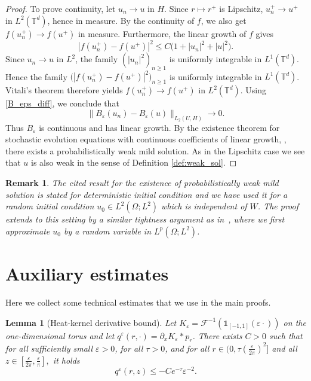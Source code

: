 \documentclass[a4paper,12pt]{article}
\newtheorem{lemma}[theorem]{Lemma}
\newtheorem{remark}[theorem]{Remark}
\begin{document}
\begin{proof}
To prove continuity, let \(u_n\to u\) in \(H\). Since \(r\mapsto r^+\)
is Lipschitz, \(u_n^+\to u^+\) in \(L^2(\mathbb T^d)\), hence in measure. By the
continuity of \(f\), we also get $f(u_n^+)\to f(u^+)$ in measure. Furthermore, the linear growth of \(f\) gives
\[
|f(u_n^+)-f(u^+)|^2
\le
C\bigl(1+|u_n|^2+|u|^2\bigr).
\]
Since \(u_n\to u\) in \(L^2\), the family \((|u_n|^2)_{n\ge1}\) is uniformly
integrable in \(L^1(\mathbb T^d)\). Hence the family $\bigl(|f(u_n^+)-f(u^+)|^2\bigr)_{n\ge1}$ is uniformly integrable in \(L^1(\mathbb T^d)\). Vitali's theorem
therefore yields $f(u_n^+)\to f(u^+)$ in $L^2(\mathbb T^d)$. Using \eqref{B_eps_diff}, we conclude that
\[
\|B_\varepsilon(u_n)-B_\varepsilon(u)\|_{L_2(U,H)}
\to 0 .
\]
Thus \(B_\varepsilon\) is continuous and has linear growth.  By the existence theorem for
stochastic evolution equations with continuous coefficients of linear growth,
\cite[Theorem 8.1]{DaPrato2014}, there exists a
probabilistically weak mild solution. As in the Lipschitz case we see that $u$ is also weak in the sense of Definition \ref{def:weak_sol}.
\end{proof}

\begin{remark}
The cited result \cite[Theorem~8.1]{DaPrato2014} for the existence of probabilistically weak mild solution is stated for deterministic initial condition and  we have used it for a random initial condition $u_0 \in L^2(\Omega; L^2)$ which is independent of $W$.  
The proof extends to this setting by a similar tightness argument as in~\cite[Chapter~8]{DaPrato2014}, where we first approximate $u_0$ by a random variable in $L^p(\Omega;L^2)$. 
\end{remark}



\section{Auxiliary estimates}\label{AppendixA}

Here we collect some technical estimates that we use in the main proofs.


\begin{lemma}[Heat-kernel derivative bound]\label{lem:q-estimate} Let $K_\varepsilon = \mathcal F^{-1} (\mathds{1}_{[-1,1]}(\varepsilon\cdot))$ on the one-dimensional torus and let $q^\varepsilon(r,\cdot) = \partial_x K_\varepsilon\ast p_r$.  There exists $C>0$ such that for all sufficiently small $\varepsilon>0$, for all $\tau>0$, and for all
$
r\in (0, \tau(\tfrac{\varepsilon}{2\pi})^2]
$ 
and all
$ 
z\in\left[\frac{\varepsilon}{2\pi},\frac{\varepsilon}{\pi}\right],
$
it holds
\[
q^\varepsilon(r,z)
\leq
-C e^{-\tau}\varepsilon^{-2}.
\]
\end{lemma}
\end{document}
